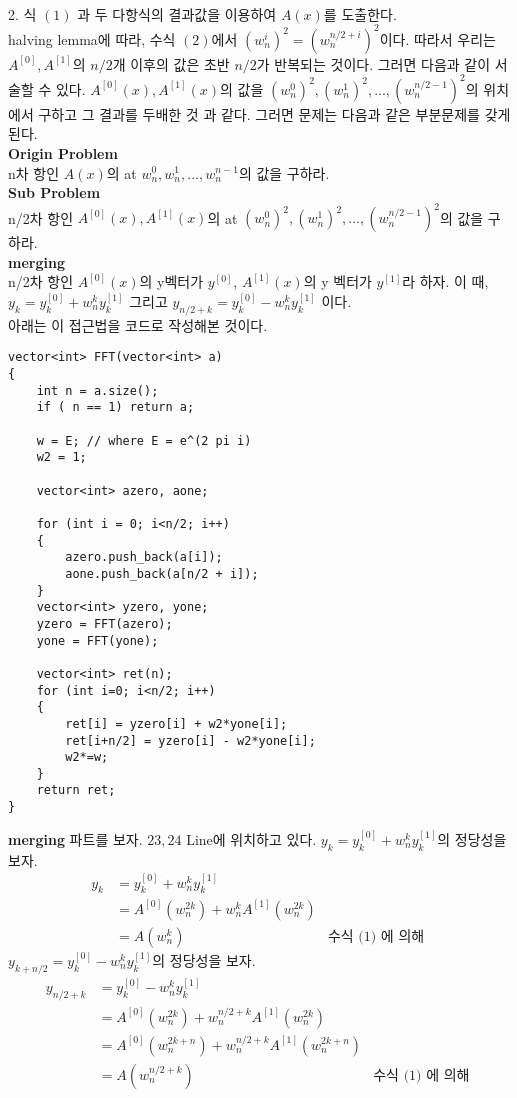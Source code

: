 \documentclass{article}
\begin{document}
\\
2. 식 $(1)$ 과 두 다항식의 결과값을 이용하여 $A(x)$를 도출한다. 
\\
halving lemma에 따라, 수식 $(2)$에서 $(w_n^i)^2 = (w_n^{n/2+i})^2$이다. 
따라서 우리는 $A^{[0]}, A^{[1]}$의 $n/2$개 이후의 값은 초반 $n/2$가 반복되는 것이다.
그러면 다음과 같이 서술할 수 있다. $A^{[0]}(x), A^{[1]}(x)$의 값을 $(w_n^0)^2, (w_n^1)^2, ... , (w_n^{n/2-1})^2$의 위치에서 구하고 
그 결과를 두배한 것 과 같다. 그러면 문제는 다음과 같은 부분문제를 갖게된다. 
\\
\textbf{Origin Problem}
\\
n차 항인 $A(x)$의 at $w_n^0, w_n^1, ... , w_n^{n-1}$의 값을 구하라. 
\\
\textbf{Sub Problem}
\\
n/2차 항인 $A^{[0]}(x), A^{[1]}(x)$의 at $(w_n^0)^2, (w_n^1)^2, ... , (w_n^{n/2-1})^2$의 값을 구하라.
\\
\textbf{merging}
\\
n/2차 항인 $A^{[0]}(x)$의 y벡터가 $y^{[0]}$, $A^{[1]}(x)$의 y 벡터가 $y^{[1]}$라 하자. 
이 때, $y_k = y_k^{[0]} + w_n^k y_k^{[1]}$ 그리고 $y_{n/2+k} = y_k^{[0]} - w_n^k y_k^{[1]}$ 이다. 
\pagebreak
\\
아래는 이 접근법을 코드로 작성해본 것이다. 
\begin{lstlisting}
vector<int> FFT(vector<int> a)
{
    int n = a.size();
    if ( n == 1) return a;

    w = E; // where E = e^(2 pi i)
    w2 = 1;

    vector<int> azero, aone;

    for (int i = 0; i<n/2; i++)
    {
        azero.push_back(a[i]);
        aone.push_back(a[n/2 + i]);
    }
    vector<int> yzero, yone;
    yzero = FFT(azero);
    yone = FFT(yone);

    vector<int> ret(n);
    for (int i=0; i<n/2; i++)
    {
        ret[i] = yzero[i] + w2*yone[i];
        ret[i+n/2] = yzero[i] - w2*yone[i];
        w2*=w;
    }
    return ret;
}
\end{lstlisting}
\textbf{merging} 파트를 보자. $23, 24$ Line에 위치하고 있다. 
$y_k = y_k^{[0]} + w_n^k y_k^{[1]}$의 정당성을 보자. 
\begin{align*}
    y_k &= y_k^{[0]} + w_n^k y_k^{[1]}\\
    &=A^{[0]}(w_n^{2k}) + w_n^kA^{[1]}(w_n^{2k})\\
    &=A(w_n^k) &\text{수식 (1) 에 의해 }
\end{align*}
$y_{k+n/2} = y_k^{[0]} - w_n^k y_k^{[1]}$의 정당성을 보자. 
\begin{align*}
    y_{n/2+k} &= y_k^{[0]} - w_n^k y_k^{[1]}\\
    &=A^{[0]}(w_n^{2k}) + w_n^{n/2+k}A^{[1]}(w_n^{2k})\\
    &=A^{[0]}(w_n^{2k+n}) + w_n^{n/2+k}A^{[1]}(w_n^{2k+n})\\
    &=A(w_n^{n/2+k}) &\text{수식 (1) 에 의해 }
\end{align*}
\pagebreak
\end{document}
